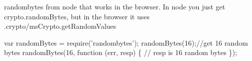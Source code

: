 \href{https://www.npmjs.org/package/randombytes}{\tt } \href{https://travis-ci.org/crypto-browserify/randombytes}{\tt }

randombytes from node that works in the browser. In node you just get crypto.\+random\+Bytes, but in the browser it uses .crypto/ms\+Crypto.\+get\+Random\+Values


\begin{DoxyCode}
var randomBytes = require('randombytes');
randomBytes(16);//get 16 random bytes
randomBytes(16, function (err, resp) \{
  // resp is 16 random bytes
\});
\end{DoxyCode}
 